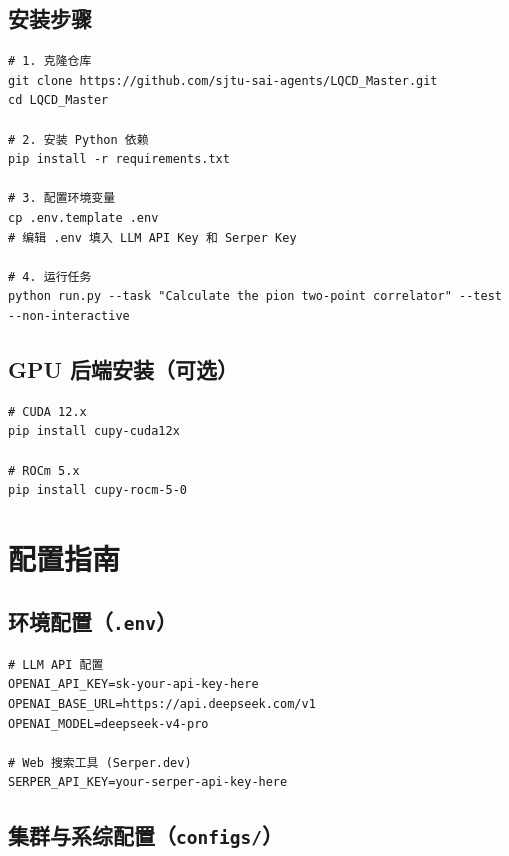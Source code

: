 \documentclass[12pt,a4paper]{ctexart}
\begin{document}
\subsection{安装步骤}

\begin{lstlisting}[style=bashcode]
# 1. 克隆仓库
git clone https://github.com/sjtu-sai-agents/LQCD_Master.git
cd LQCD_Master

# 2. 安装 Python 依赖
pip install -r requirements.txt

# 3. 配置环境变量
cp .env.template .env
# 编辑 .env 填入 LLM API Key 和 Serper Key

# 4. 运行任务
python run.py --task "Calculate the pion two-point correlator" --test --non-interactive
\end{lstlisting}

\subsection{GPU 后端安装（可选）}

\begin{lstlisting}[style=bashcode]
# CUDA 12.x
pip install cupy-cuda12x

# ROCm 5.x
pip install cupy-rocm-5-0
\end{lstlisting}

\section{配置指南}

\subsection{环境配置（\texttt{.env}）}

\begin{lstlisting}[style=bashcode]
# LLM API 配置
OPENAI_API_KEY=sk-your-api-key-here
OPENAI_BASE_URL=https://api.deepseek.com/v1
OPENAI_MODEL=deepseek-v4-pro

# Web 搜索工具 (Serper.dev)
SERPER_API_KEY=your-serper-api-key-here
\end{lstlisting}

\subsection{集群与系综配置（\texttt{configs/}）}
\end{document}
